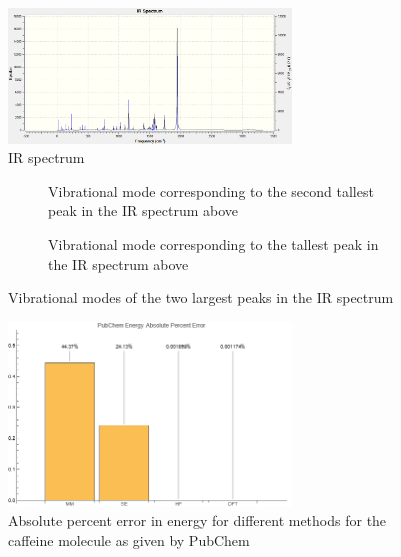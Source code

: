 \documentclass{report}
\begin{document}
            \begin{figure}[h]
                \centering
                \includegraphics[width=0.67\textwidth]{images/spectrum.png}
                \caption{IR spectrum}
                \label{fig:spectrum}
            \end{figure}

            \begin{figure}[h]
                \centering
                \begin{subfigure}[b]{0.45\textwidth}
                    \centering
                    \caption{Vibrational mode corresponding to the second tallest peak in the IR spectrum above}
                    \label{fig:LowPeak}
                \end{subfigure}
                \hfill
                \begin{subfigure}[b]{0.45\textwidth}
                    \centering
                    \caption{Vibrational mode corresponding to the tallest peak in the IR spectrum above}
                    \label{fig:HighPeak}
                \end{subfigure}
                \caption{Vibrational modes of the two largest peaks in the IR spectrum}
                \label{fig:vibModes}
            \end{figure}

            \begin{figure}[h]
                \centering
                \includegraphics[width=0.67\textwidth]{images/PubChem_Energy_APE.png}
                \caption{Absolute percent error in energy for different methods for the caffeine molecule as given by PubChem}
                \label{fig:PubChem_Energy_APE}
            \end{figure}
\end{document}
